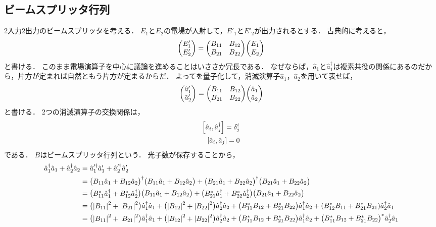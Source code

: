 \documentclass{report}
\begin{document}
  \subsection{ビームスプリッタ行列}
    2入力2出力のビームスプリッタを考える．
    $E_1$と$E_2$の電場が入射して，$E'_1$と$E'_2$が出力されるとする．
    古典的に考えると，
    \begin{align}
      \mqty(E'_1 \\ E'_2) = \mqty(\xmat*{B}{2}{2})\mqty(E_1 \\ E_2)\label{input-classical}
    \end{align}
    と書ける．
    このまま電場演算子を中心に議論を進めることはいささか冗長である．
    なぜならば，$\hat{a}_1$と$\hat{a}_1^{\dag}$は複素共役の関係にあるのだから，片方が定まれば自然ともう片方が定まるからだ．
    よってを量子化して，消滅演算子$\hat{a}_1$，$\hat{a}_2$を用いて表せば，
    \begin{align}
      \mqty(\hat{a}_1' \\ \hat{a}_2') = \mqty(\xmat*{B}{2}{2})\mqty(\hat{a}_1 \\ \hat{a}_2)
    \end{align}
    と書ける．
    2つの消滅演算子の交換関係は，
    \begin{align}
      \qty[\hat{a}_i, \hat{a}_j^{\dag}] = \delta_{j}^{i} \\ 
      \qty[\hat{a}_i, \hat{a}_j] = 0
    \end{align}
    である．
    $B$はビームスプリッタ行列という．
    光子数が保存することから，
    \begin{align}
      \hat{a}_1^{\dag}\hat{a}_1 + \hat{a}_2^{\dag}\hat{a}_2 &= \hat{a}_1'^{\dag}\hat{a}_1' + \hat{a}_2'^{\dag}\hat{a}_2' \\
      &= \mqty(B_{11}\hat{a}_1 + B_{12}\hat{a}_2)^{\dag}\mqty(B_{11}\hat{a}_1 + B_{12}\hat{a}_2) + \mqty(B_{21}\hat{a}_1 + B_{22}\hat{a}_2)^{\dag}\mqty(B_{21}\hat{a}_1 + B_{22}\hat{a}_2) \\ 
      &= \mqty(B_{11}^*\hat{a}_1^{\dag} + B_{12}^*\hat{a}_2^{\dag})\mqty(B_{11}\hat{a}_1 + B_{12}\hat{a}_2) + \mqty(B_{21}^*\hat{a}_1^{\dag} + B_{22}^*\hat{a}_2^{\dag})\mqty(B_{21}\hat{a}_1 + B_{22}\hat{a}_2) \\ 
      &= \mqty(\abs{B_{11}}^2 + \abs{B_{21}}^2)\hat{a}_1^{\dag}\hat{a}_1 + \mqty(\abs{B_{12}}^2 + \abs{B_{22}}^2)\hat{a}_2^{\dag}\hat{a}_2 + \mqty(B_{11}^*B_{12} + B_{21}^*B_{22})\hat{a}_1^{\dag}\hat{a}_2 + \qty(B_{12}^*B_{11} + B_{21}^*B_{21})\hat{a}_2^{\dag}\hat{a}_1 \\ 
      &= \mqty(\abs{B_{11}}^2 + \abs{B_{21}}^2)\hat{a}_1^{\dag}\hat{a}_1 + \mqty(\abs{B_{12}}^2 + \abs{B_{22}}^2)\hat{a}_2^{\dag}\hat{a}_2 + \mqty(B_{11}^*B_{12} + B_{21}^*B_{22})\hat{a}_1^{\dag}\hat{a}_2 + \mqty(B_{11}^*B_{12} + B_{21}^*B_{22})^*\hat{a}_2^{\dag}\hat{a}_1
    \end{align}
\end{document}
